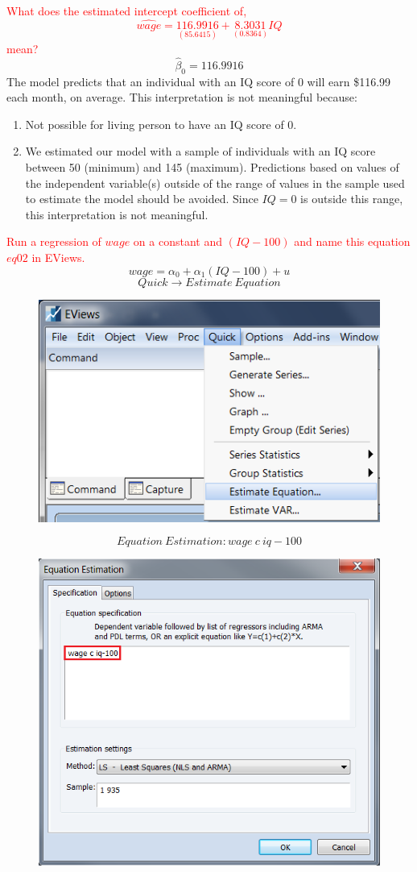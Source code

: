 \documentclass[12pt]{report}
\begin{document}
\noindent \textcolor{red}{What does the estimated intercept coefficient of,
$$\widehat{wage} = \underset{(85.6415)}{116.9916} + \underset{(0.8364)}{8.3031}IQ$$ mean?}
$$\hat{\beta}_0 = 116.9916$$
\noindent 	The model predicts that an individual with an IQ score of 0 will earn \$116.99 each month, on average. This interpretation is not meaningful because:
\begin{enumerate}
	\item Not possible for living person to have an IQ score of 0.
	\item We estimated our model with a sample of individuals with an IQ score between 50 (minimum) and 145 (maximum). Predictions based on values of the independent variable(s) outside of the range of values in the sample used to estimate the model should be avoided. Since $IQ = 0$ is outside this range, this interpretation is not meaningful.
\end{enumerate}
\noindent \textcolor{red}{Run a regression of $wage$ on a constant and $(IQ-100)$ and name this equation $eq02$ in EViews.}
$$wage = \alpha_0 + \alpha_1(IQ-100) + u$$
$$Quick \to Estimate\ Equation$$
\begin{figure}[H]
	\centering
	\includegraphics{q3_11}
\end{figure}
\vspace{-\baselineskip}
$$Equation\ Estimation: wage\ c\ iq-100$$
\begin{figure}[H]
	\centering
	\includegraphics{q3_22}
\end{figure}
\end{document}
